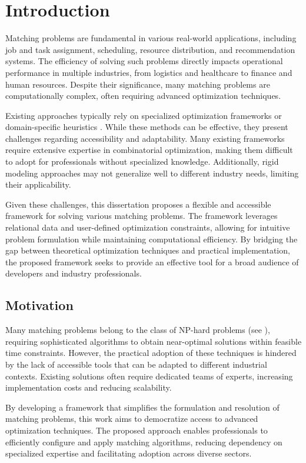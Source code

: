 \chapter{Introduction} \label{chap:introduction}

Matching problems are fundamental in various real-world applications, including job and task assignment, scheduling, resource distribution, and recommendation systems. The efficiency of solving such problems directly impacts operational performance in multiple industries, from logistics and healthcare to finance and human resources. Despite their significance, many matching problems are computationally complex, often requiring advanced optimization techniques.

Existing approaches typically rely on specialized optimization frameworks or domain-specific heuristics \cite{ieee_survey}. While these methods can be effective, they present challenges regarding accessibility and adaptability. Many existing frameworks require extensive expertise in combinatorial optimization, making them difficult to adopt for professionals without specialized knowledge. Additionally, rigid modeling approaches may not generalize well to different industry needs, limiting their applicability.

Given these challenges, this dissertation proposes a flexible and accessible framework for solving various matching problems. The framework leverages relational data and user-defined optimization constraints, allowing for intuitive problem formulation while maintaining computational efficiency. By bridging the gap between theoretical optimization techniques and practical implementation, the proposed framework seeks to provide an effective tool for a broad audience of developers and industry professionals.

\section{Motivation}
Many matching problems belong to the class of NP-hard problems (see \cite{Karp1972}), requiring sophisticated algorithms to obtain near-optimal solutions within feasible time constraints. However, the practical adoption of these techniques is hindered by the lack of accessible tools that can be adapted to different industrial contexts. Existing solutions often require dedicated teams of experts, increasing implementation costs and reducing scalability.

By developing a framework that simplifies the formulation and resolution of matching problems, this work aims to democratize access to advanced optimization techniques. The proposed approach enables professionals to efficiently configure and apply matching algorithms, reducing dependency on specialized expertise and facilitating adoption across diverse sectors.

